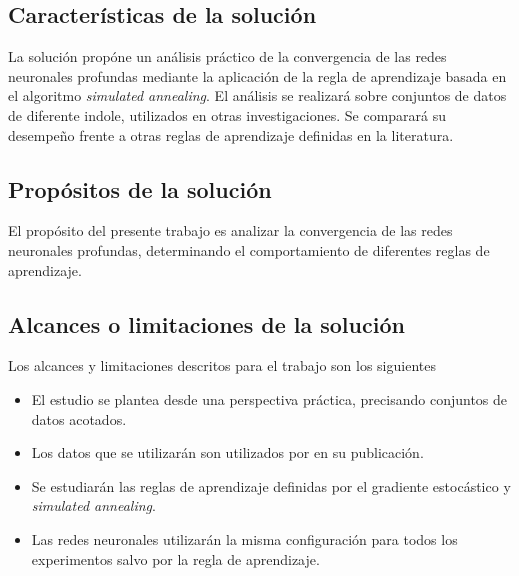 \subsection{Características de la solución}
La solución propóne un análisis práctico de la convergencia de las redes neuronales profundas mediante la aplicación de la regla de aprendizaje basada en el algoritmo {\em simulated annealing}. El análisis se realizará sobre conjuntos de datos de diferente indole, utilizados en otras investigaciones. Se comparará su desempeño frente a otras reglas de aprendizaje definidas en la literatura.

\subsection{Propósitos de la solución}
El propósito del presente trabajo es analizar la convergencia de las redes neuronales profundas, determinando el comportamiento de diferentes reglas de aprendizaje.


\subsection{Alcances o limitaciones de la solución}
Los alcances y limitaciones descritos para el trabajo son los siguientes
\begin{itemize}
	\item El estudio se plantea desde una perspectiva práctica, precisando conjuntos de datos acotados.

    \item Los datos que se utilizarán son utilizados por  en su publicación.

	\item Se estudiarán las reglas de aprendizaje definidas por el gradiente estocástico y {\em simulated annealing}.

	\item Las redes neuronales utilizarán la misma configuración para todos los experimentos salvo por la regla de aprendizaje.
\end{itemize}
